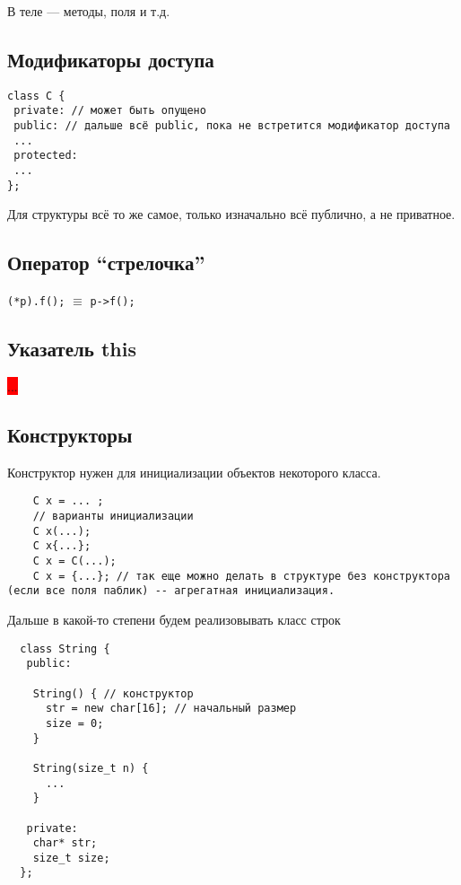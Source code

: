 \documentclass[12pt]{article}
\begin{document}
В теле --- методы, поля и т.д.

\subsection{Модификаторы доступа}

\begin{lstlisting}
class C {
 private: // может быть опущено
 public: // дальше всё public, пока не встретится модификатор доступа
 ...
 protected:
 ...
};
\end{lstlisting}
 
Для структуры всё то же самое, только изначально всё публично, а не приватное. 

\subsection{Оператор ``стрелочка''}

\texttt{(*p).f();} $\equiv$ \texttt{p->f();}

\subsection{Указатель this}

\colorbox{red}{...}

\subsection{Конструкторы}

Конструктор нужен для инициализации объектов некоторого класса. 

\begin{lstlisting}
	C x = ... ;
	// варианты инициализации
	C x(...);
	C x{...}; 
	C x = C(...);
	C x = {...}; // так еще можно делать в структуре без конструктора (если все поля паблик) -- агрегатная инициализация. 
\end{lstlisting}


Дальше в какой-то степени будем реализовывать класс строк

\begin{lstlisting}
  class String {
   public:
     
    String() { // конструктор
      str = new char[16]; // начальный размер
      size = 0;
    } 
    
    String(size_t n) {
      ...
    }
     
   private:
    char* str;
    size_t size;  	
  };
\end{lstlisting}
\end{document}
